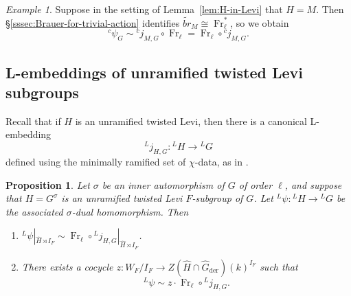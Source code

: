 \documentclass[reqno]{amsart}
\numberwithin{equation}{subsection}
\newcommand{\wt}[1]{\widetilde{#1}}
\newcommand{\wh}[1]{\widehat{#1}}
\newcommand{\co}{\colon}
\newcommand{\ld}{{}^L}
\newcommand{\lc}{{}^c}
\DeclareMathOperator{\der}{der}
\DeclareMathOperator{\Fr}{Fr}
\newcommand{\cbr}{br}
\newtheorem{prop}[thm]{Proposition}
\theoremstyle{remark}
\newtheorem{example}[thm]{Example}
\numberwithin{equation}{subsection}
\numberwithin{figure}{subsection}
\begin{document}
\begin{example}\label{ex:H=Levi}
Suppose in the setting of Lemma~\ref{lem:H-in-Levi} that $H = M$. Then \S\ref{sssec:Brauer-for-trivial-action} identifies $\wt{\cbr}_M \cong \Fr_\ell^*$, so we obtain
\[
\lc \psi_G \sim \lc j_{M,G} \circ \Fr_\ell = \Fr_\ell \circ \lc j_{M,G}.
\]
\end{example}

\subsection{L-embeddings of unramified twisted Levi subgroups}

Recall that if $H$ is an unramified twisted Levi, then there is a canonical L-embedding
\begin{equation}\label{eqn:L-embedding-of-unram-twisted-Levi}
\ld j_{H,G}\co \ld H \rightarrow \ld G
\end{equation}
defined using the minimally ramified set of $\chi$-data, as in \cite[Definition~4.5.1]{CF26a}.

\begin{prop}\label{prop:sigma-dual-unram-agreement-on-inertia}
Let $\sigma$ be an inner automorphism of $G$ of order $\ell$, and suppose that $H = G^\sigma$ is an unramified twisted Levi $F$-subgroup of $G$. Let $\ld\psi\co \ld H \to \ld G$ be the associated $\sigma$-dual homomorphism. Then
\begin{enumerate}
    \item $\ld\psi|_{\wh H \rtimes I_F} \sim \Fr_\ell \circ \ld j_{H,G}|_{\wh H \rtimes I_F}$.
    \item There exists a cocycle $z\co W_F/I_F \to Z(\wh H \cap \wh G_{\der})(k)^{I_F}$ such that
    \[
    \ld\psi \sim z \cdot \Fr_\ell \circ \ld j_{H,G}.
    \]
\end{enumerate}
\end{prop}
\end{document}
